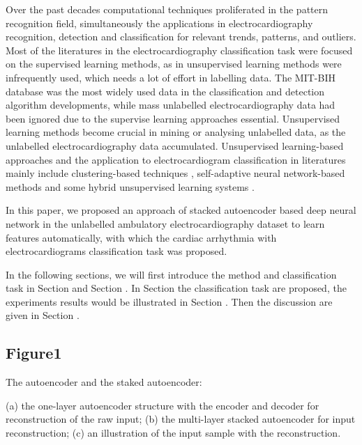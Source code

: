 \documentclass{bmcart}
\begin{document}
Over the past decades computational techniques proliferated in the pattern recognition field, simultaneously the applications in electrocardiography recognition, detection and classification for relevant trends, patterns, and outliers. 
Most of the literatures in the electrocardiography classification task were focused on the supervised learning methods, as in unsupervised learning methods were infrequently used, which needs a lot of effort in labelling data. The MIT-BIH database \cite{physionet} was the most widely used data in the classification and detection algorithm developments, while mass unlabelled electrocardiography data had been ignored due to the supervise learning approaches essential. 
Unsupervised learning methods become crucial in mining or analysing unlabelled data, as the unlabelled electrocardiography data accumulated. Unsupervised learning-based approaches and the application to electrocardiogram classification in literatures mainly include clustering-based techniques \cite{lager, nishizawa, maier}, self-adaptive neural network-based methods \cite{palreddy, risk} and some hybrid unsupervised learning systems \cite{tadejko}. 

In this paper, we proposed an approach of stacked autoencoder based deep neural network in the unlabelled ambulatory electrocardiography dataset to learn features automatically, with which the cardiac arrhythmia with electrocardiograms classification task was proposed. 

In the following sections, we will first introduce the method and classification task in Section  \uppercase\expandafter{}  and Section  \uppercase\expandafter{} . In Section  \uppercase\expandafter{}  the classification task are proposed, the experiments results would be illustrated in Section  \uppercase\expandafter{} . Then the discussion are given in Section  \uppercase\expandafter{} .

\subsection*{Figure1}

The autoencoder and the staked autoencoder:

(a) the one-layer autoencoder structure with the encoder and decoder for reconstruction of the raw input; (b) the multi-layer stacked autoencoder for input reconstruction; (c) an illustration of the input sample with the reconstruction.
\end{document}
